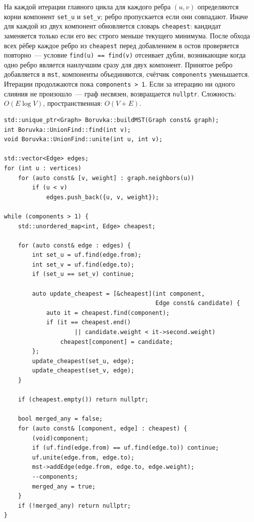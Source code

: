 На каждой итерации главного цикла для каждого ребра $(u, v)$
определяются корни компонент \texttt{set\_u} и \texttt{set\_v};
ребро пропускается если они совпадают. Иначе для каждой из двух
компонент обновляется словарь \texttt{cheapest}: кандидат заменяется
только если его вес строго меньше текущего минимума. После обхода
всех рёбер каждое ребро из \texttt{cheapest} перед добавлением
в остов проверяется повторно~--- условие \texttt{find(u) == find(v)}
отсеивает дубли, возникающие когда одно ребро является наилучшим
сразу для двух компонент. Принятое ребро добавляется в \texttt{mst},
компоненты объединяются, счётчик \texttt{components} уменьшается.
Итерации продолжаются пока \texttt{components > 1}. Если за итерацию
ни одного слияния не произошло~--- граф несвязен, возвращается
\texttt{nullptr}.
Сложность: $O(E \log V)$, пространственная: $O(V + E)$.

\begin{lstlisting}[style=cppstyle, caption={Сбор рёбер, выбор дешевейшего ребра для каждой компоненты и слияние (Boruvka.cc)}]
std::unique_ptr<Graph> Boruvka::buildMST(Graph const& graph);
int Boruvka::UnionFind::find(int v);
void Boruvka::UnionFind::unite(int u, int v);

std::vector<Edge> edges;
for (int u : vertices)
    for (auto const& [v, weight] : graph.neighbors(u))
        if (u < v)
            edges.push_back({u, v, weight});

while (components > 1) {
    std::unordered_map<int, Edge> cheapest;

    for (auto const& edge : edges) {
        int set_u = uf.find(edge.from);
        int set_v = uf.find(edge.to);
        if (set_u == set_v) continue;

        auto update_cheapest = [&cheapest](int component,
                                           Edge const& candidate) {
            auto it = cheapest.find(component);
            if (it == cheapest.end()
                    || candidate.weight < it->second.weight)
                cheapest[component] = candidate;
        };
        update_cheapest(set_u, edge);
        update_cheapest(set_v, edge);
    }

    if (cheapest.empty()) return nullptr;

    bool merged_any = false;
    for (auto const& [component, edge] : cheapest) {
        (void)component;
        if (uf.find(edge.from) == uf.find(edge.to)) continue;
        uf.unite(edge.from, edge.to);
        mst->addEdge(edge.from, edge.to, edge.weight);
        --components;
        merged_any = true;
    }
    if (!merged_any) return nullptr;
}
\end{lstlisting}

